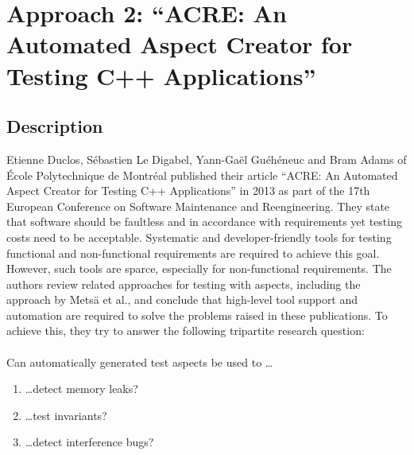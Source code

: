 \newpage
\section{Approach 2: \enquote{ACRE: An Automated Aspect Creator for Testing C++ Applications} } \label{found}

\subsection{Description}

Etienne Duclos, Sébastien Le Digabel, Yann-Gaël Guéhéneuc and Bram Adams \cite{Duclos} of École Polytechnique de Montréal published their article \enquote{ACRE: An Automated Aspect Creator for Testing C++ Applications} in 2013 as part of the 17th European Conference on Software Maintenance and Reengineering. They state that software should be faultless and in accordance with requirements yet testing costs need to be acceptable. Systematic and developer-friendly tools for testing functional and non-functional requirements are required to achieve this goal. However, such tools are sparce, especially for non-functional requirements. The authors review related approaches for testing with aspects, including the approach by Metsä et al., and conclude that high-level tool support and automation are required to solve the problems raised in these publications. To achieve this, they try to answer the following tripartite research question:\\
\\
Can automatically generated test aspects be used to \dots
\begin{enumerate}
\item \dots detect memory leaks?
\item \dots test invariants?  
\item \dots detect interference bugs?
\end{enumerate}

